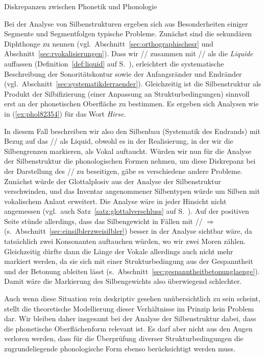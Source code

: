 \begin{Vertiefung}{Diskrepanzen zwischen Phonetik und Phonologie}
  

\noindent Bei der Analyse von Silbenstrukturen ergeben sich aus Besonderheiten einiger Segmente und Segmentfolgen typische Probleme.
Zunächst sind die sekundären Diphthonge zu nennen (vgl.\ Abschnitt~\ref{sec:orthographischesr} und Abschnitt~\ref{sec:rvokalisierungen}).
Dass wir // zusammen mit // als die \textit{Liquide} auffassen (Definition~\ref{def:liquid} auf S.\ \pageref{def:liquid}), erleichtert die systematische Beschreibung der Sonoritätskontur sowie der Anfangsränder und Endränder (vgl.\ Abschnitt~\ref{sec:systematikderraender}).
Gleichzeitig ist die Silbenstruktur als Produkt der Silbifizierung (einer Anpassung an Strukturbedingungen) sinnvoll erst an der phonetischen Oberfläche zu bestimmen.
Es ergeben sich Analysen wie in (\ref{ex:phol82354}) für das Wort \textit{Hirse}.

\begin{exe}
\end{exe}

In diesem Fall beschreiben wir also den Silbenbau (Systematik des Endrands) mit Bezug auf das // als Liquid, obwohl es in der Realisierung, in der wir die Silbengrenzen markieren, als Vokal \textipa{[@]} auftaucht.
Würden wir nun für die Analyse der Silbenstruktur die phonologischen Formen nehmen, um diese Diskrepanz bei der Darstellung des // zu beseitigen, gäbe es verschiedene andere Probleme.
Zunächst würde der Glottalplosiv \textipa{[P]} aus der Analyse der Silbenstruktur verschwinden, und das Inventar angenommener Silbentypen würde um Silben mit vokalischem Anlaut erweitert.
Die Analyse wäre in jeder Hinsicht nicht angemessen (vgl.\ auch Satz~\ref{satz:glottalverschluss} auf S.\ \pageref{satz:glottalverschluss}).
Auf der positiven Seite stünde allerdings, dass das Silbengewicht in Fällen mit // $\Rightarrow$ \textipa{[N]} (s.\ Abschnitt~\ref{sec:einsilblerzweisilbler}) besser in der Analyse sichtbar wäre, da tatsächlich zwei Konsonanten auftauchen würden, wo wir zwei Moren zählen.
Gleichzeitig dürfte dann die Länge der Vokale allerdings auch nicht mehr markiert werden, da sie sich mit einer Strukturbedingung aus der Gespanntheit und der Betonung ableiten lässt (s.\ Abschnitt~\ref{sec:gespanntheitbetonunglaenge}).
Damit wäre die Markierung des Silbengewichts also überwiegend schlechter.

Auch wenn diese Situation rein deskriptiv gesehen unübersichtlich zu sein scheint, stellt die theoretische Modellierung dieser Verhältnisse im Prinzip kein Problem dar.
Wir bleiben daher insgesamt bei der Analyse der Silbenstruktur dabei, dass die phonetische Oberflächenform relevant ist.
Es darf aber nicht aus den Augen verloren werden, dass für die Überprüfung diverser Strukturbedingungen die zugrundeliegende phonologische Form ebenso berücksichtigt werden muss.

\end{Vertiefung}


